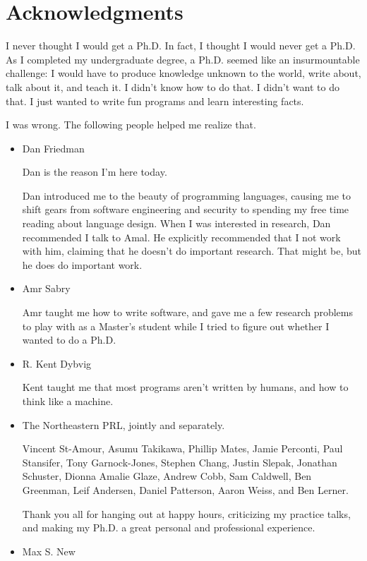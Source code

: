 
\begingroup
\let\clearpage\relax
\let\cleardoublepage\relax
\let\cleardoublepage\relax
\chapter*{Acknowledgments}
I never thought I would get a Ph.D.
In fact, I thought I would never get a Ph.D.
As I completed my undergraduate degree, a Ph.D. seemed like an insurmountable
challenge: I would have to produce knowledge unknown to the world, write about,
talk about it, and teach it.
I didn't know how to do that.
I didn't want to do that.
I just wanted to write fun programs and learn interesting facts.

I was wrong.
The following people helped me realize that.
\begin{itemize}
\item Dan Friedman

  Dan is the reason I'm here today.

  Dan introduced me to the beauty of programming languages, causing me to shift
  gears from software engineering and security to spending my free time reading
  about language design.
  When I was interested in research, Dan recommended I talk to Amal.
  He explicitly recommended that I not work with him, claiming that he doesn't
  do important research.
  That might be, but he does do important work.
\item Amr Sabry

  Amr taught me how to write software, and gave me a few research problems to
  play with as a Master's student while I tried to figure out whether I wanted
  to do a Ph.D.
\item R. Kent Dybvig

  Kent taught me that most programs aren't written by humans, and how to think
  like a machine.
\item The Northeastern PRL, jointly and separately.

  Vincent St-Amour, Asumu Takikawa, Phillip Mates, Jamie Perconti, Paul
  Stansifer, Tony Garnock-Jones, Stephen Chang, Justin Slepak, Jonathan
  Schuster, Dionna Amalie Glaze, Andrew Cobb, Sam Caldwell, Ben Greenman, Leif
  Andersen, Daniel Patterson, Aaron Weiss, and Ben Lerner.

  Thank you all for hanging out at happy hours, criticizing my practice talks,
  and making my Ph.D. a great personal and professional experience.
\item Max S. New


\end{itemize}
